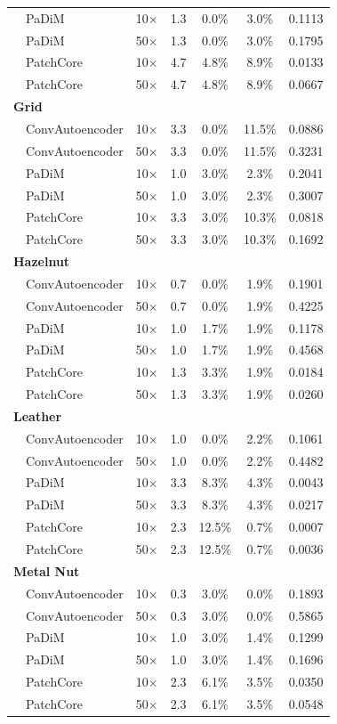 \begin{table}[t]
{\begin{tabular}{llccccc}
 & PaDiM & 10$\times$ & 1.3 & 0.0\% & 3.0\% & 0.1113 \\
 & PaDiM & 50$\times$ & 1.3 & 0.0\% & 3.0\% & 0.1795 \\
 & PatchCore & 10$\times$ & 4.7 & 4.8\% & 8.9\% & 0.0133 \\
 & PatchCore & 50$\times$ & 4.7 & 4.8\% & 8.9\% & 0.0667 \\
\midrule
\multicolumn{7}{l}{\textbf{Grid}} \\
 & ConvAutoencoder & 10$\times$ & 3.3 & 0.0\% & 11.5\% & 0.0886 \\
 & ConvAutoencoder & 50$\times$ & 3.3 & 0.0\% & 11.5\% & 0.3231 \\
 & PaDiM & 10$\times$ & 1.0 & 3.0\% & 2.3\% & 0.2041 \\
 & PaDiM & 50$\times$ & 1.0 & 3.0\% & 2.3\% & 0.3007 \\
 & PatchCore & 10$\times$ & 3.3 & 3.0\% & 10.3\% & 0.0818 \\
 & PatchCore & 50$\times$ & 3.3 & 3.0\% & 10.3\% & 0.1692 \\
\midrule
\multicolumn{7}{l}{\textbf{Hazelnut}} \\
 & ConvAutoencoder & 10$\times$ & 0.7 & 0.0\% & 1.9\% & 0.1901 \\
 & ConvAutoencoder & 50$\times$ & 0.7 & 0.0\% & 1.9\% & 0.4225 \\
 & PaDiM & 10$\times$ & 1.0 & 1.7\% & 1.9\% & 0.1178 \\
 & PaDiM & 50$\times$ & 1.0 & 1.7\% & 1.9\% & 0.4568 \\
 & PatchCore & 10$\times$ & 1.3 & 3.3\% & 1.9\% & 0.0184 \\
 & PatchCore & 50$\times$ & 1.3 & 3.3\% & 1.9\% & 0.0260 \\
\midrule
\multicolumn{7}{l}{\textbf{Leather}} \\
 & ConvAutoencoder & 10$\times$ & 1.0 & 0.0\% & 2.2\% & 0.1061 \\
 & ConvAutoencoder & 50$\times$ & 1.0 & 0.0\% & 2.2\% & 0.4482 \\
 & PaDiM & 10$\times$ & 3.3 & 8.3\% & 4.3\% & 0.0043 \\
 & PaDiM & 50$\times$ & 3.3 & 8.3\% & 4.3\% & 0.0217 \\
 & PatchCore & 10$\times$ & 2.3 & 12.5\% & 0.7\% & 0.0007 \\
 & PatchCore & 50$\times$ & 2.3 & 12.5\% & 0.7\% & 0.0036 \\
\midrule
\multicolumn{7}{l}{\textbf{Metal Nut}} \\
 & ConvAutoencoder & 10$\times$ & 0.3 & 3.0\% & 0.0\% & 0.1893 \\
 & ConvAutoencoder & 50$\times$ & 0.3 & 3.0\% & 0.0\% & 0.5865 \\
 & PaDiM & 10$\times$ & 1.0 & 3.0\% & 1.4\% & 0.1299 \\
 & PaDiM & 50$\times$ & 1.0 & 3.0\% & 1.4\% & 0.1696 \\
 & PatchCore & 10$\times$ & 2.3 & 6.1\% & 3.5\% & 0.0350 \\
 & PatchCore & 50$\times$ & 2.3 & 6.1\% & 3.5\% & 0.0548 \\
\bottomrule
\end{tabular}}
\end{table}
